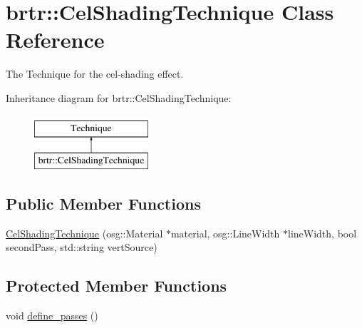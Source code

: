 \hypertarget{classbrtr_1_1_cel_shading_technique}{\section{brtr\+:\+:Cel\+Shading\+Technique Class Reference}
\label{classbrtr_1_1_cel_shading_technique}
}


The Technique for the cel-\/shading effect.  


Inheritance diagram for brtr\+:\+:Cel\+Shading\+Technique\+:\begin{figure}[H]
\begin{center}
\leavevmode
\includegraphics[height=2.000000cm]{classbrtr_1_1_cel_shading_technique}
\end{center}
\end{figure}
\subsection*{Public Member Functions}
\begin{DoxyCompactItemize}
\item 
\hyperlink{classbrtr_1_1_cel_shading_technique_a4c77c4f488907999068edd4d9b83aa4f}{Cel\+Shading\+Technique} (osg\+::\+Material $\ast$material, osg\+::\+Line\+Width $\ast$line\+Width, bool second\+Pass, std\+::string vert\+Source)
\end{DoxyCompactItemize}
\subsection*{Protected Member Functions}
\begin{DoxyCompactItemize}
\item 
void \hyperlink{classbrtr_1_1_cel_shading_technique_a7b44016e8ed4bc9c2c129b93de2f1f45}{define\+\_\+passes} ()
\end{DoxyCompactItemize}
